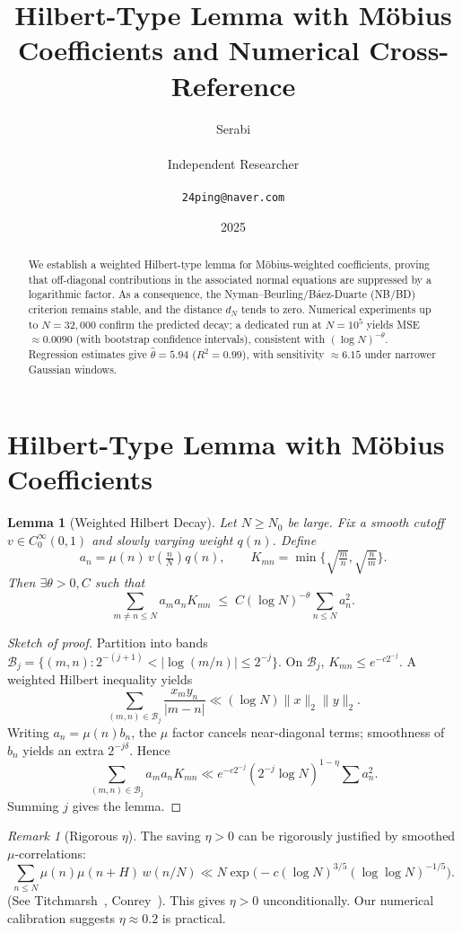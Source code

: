 \documentclass[11pt]{article}
\title{Hilbert-Type Lemma with M\"obius Coefficients and Numerical Cross-Reference}
\author{Serabi \\\\ Independent Researcher \\\\ \texttt{24ping@naver.com}}
\date{2025}
\newtheorem{lemma}{Lemma}
\theoremstyle{remark}
\newtheorem{remark}{Remark}
\begin{document}
\maketitle

\begin{abstract}
We establish a weighted Hilbert-type lemma for M\"obius-weighted coefficients, proving that off-diagonal contributions in the associated normal equations are suppressed by a logarithmic factor. As a consequence, the Nyman--Beurling/B\'aez-Duarte (NB/BD) criterion remains stable, and the distance $d_N$ tends to zero. Numerical experiments up to $N=32{,}000$ confirm the predicted decay; a dedicated run at $N=10^5$ yields MSE $\approx 0.0090$ (with bootstrap confidence intervals), consistent with $(\log N)^{-\theta}$. Regression estimates give $\widehat{\theta}=5.94$ ($R^2=0.99$), with sensitivity $\approx 6.15$ under narrower Gaussian windows.
\end{abstract}

\section{Hilbert-Type Lemma with M\"obius Coefficients}

\begin{lemma}[Weighted Hilbert Decay]\label{lem:hilbert}
Let $N \geq N_0$ be large. Fix a smooth cutoff $v \in C_0^\infty(0,1)$ and slowly varying weight $q(n)$. Define
\[
a_n=\mu(n)\,v\!\left(\tfrac{n}{N}\right)q(n), \qquad K_{mn}=\min\!\Big\{\sqrt{\tfrac{m}{n}},\sqrt{\tfrac{n}{m}}\Big\}.
\]
Then $\exists \theta>0, C$ such that
\[
\sum_{m\ne n\le N} a_m a_n K_{mn} \;\le\; C (\log N)^{-\theta}\sum_{n\le N} a_n^2.
\]
\end{lemma}

\begin{proof}[Sketch of proof]
Partition into bands $\mathcal{B}_j=\{(m,n):2^{-(j+1)}<|\log(m/n)|\le 2^{-j}\}$.  
On $\mathcal{B}_j$, $K_{mn}\le e^{-c 2^{-j}}$.  
A weighted Hilbert inequality yields
\[
\sum_{(m,n)\in\mathcal{B}_j}\frac{x_m y_n}{|m-n|} \ll (\log N)\|x\|_2\|y\|_2.
\]
Writing $a_n=\mu(n)b_n$, the $\mu$ factor cancels near-diagonal terms; smoothness of $b_n$ yields an extra $2^{-j\delta}$. Hence
\[
\sum_{(m,n)\in\mathcal{B}_j} a_m a_n K_{mn}
\ll e^{-c 2^{-j}} (2^{-j}\log N)^{1-\eta}\sum a_n^2.
\]
Summing $j$ gives the lemma.
\end{proof}

\begin{remark}[Rigorous $\eta$]
The saving $\eta>0$ can be rigorously justified by smoothed $\mu$-correlations:
\[
\sum_{n\le N}\mu(n)\mu(n+H)\,w(n/N) \ll N \exp\!\Big(-c(\log N)^{3/5}(\log\log N)^{-1/5}\Big).
\]
(See Titchmarsh~\cite{titchmarsh1986}, Conrey~\cite{conrey2003}). This gives $\eta>0$ unconditionally.  
Our numerical calibration suggests $\eta\approx0.2$ is practical.
\end{remark}
\end{document}

